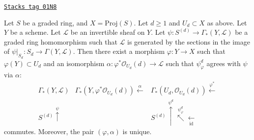 \begin{lemma}
\label{constructions-lemma-converse-construction}
\href{https://stacks.math.columbia.edu/tag/01N8}{\texttt{Stacks tag 01N8}}

Let $S$ be a graded ring, and $X = \text{Proj}(S)$.
Let $d \geq 1$ and $U_d \subset X$ as above.
Let $Y$ be a scheme.
Let $\mathcal{L}$ be an invertible sheaf on $Y$.
Let $\psi : S^{(d)} \to \Gamma_*(Y, \mathcal{L})$ be
a graded ring homomorphism such that $\mathcal{L}$ is
generated by the sections in the image of
$\psi|_{S_d} : S_d \to \Gamma(Y, \mathcal{L})$.
Then there exist a morphism
$\varphi : Y \to X$ such that $\varphi(Y) \subset U_d$ and
an isomorphism $\alpha : \varphi^*\mathcal{O}_{U_d}(d) \to \mathcal{L}$
such that $\psi_\varphi^d$ agrees with $\psi$ via $\alpha$:
$$
\begin{array}{ccc}\Gamma_*(Y, \mathcal{L}) & \Gamma_*(Y, \varphi^*\mathcal{O}_{U_d}(d)) \overset{\alpha}{\longleftarrow} & \Gamma_*(U_d, \mathcal{O}_{U_d}(d)) \overset{\varphi^*}{\longleftarrow} \\ S^{(d)} \overset{\psi}{\uparrow} &  & S^{(d)} \overset{\psi^d}{\uparrow}\overset{\psi^d_\varphi}{\nwarrow}\underset{\text{id}}{\longleftarrow}\end{array}
$$
commutes. Moreover, the pair $(\varphi, \alpha)$ is unique.
\end{lemma}


